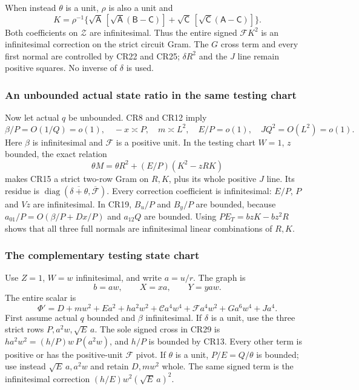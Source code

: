 When instead $\theta$ is a unit, $\rho$ is also a unit and
\[
 K=\rho^{-1}\{\sqrt{\mathsf A}\,
       [\sqrt{\mathsf A}(\mathsf B-\mathsf C)]
       +\sqrt{\mathsf C}\,
       [\sqrt{\mathsf C}(\mathsf A-\mathsf C)]\}.
 \tag{CR25}
\]
Both coefficients on $\mathcal Z$ are infinitesimal. Thus the
entire signed $\mathcal F K^2$ is an infinitesimal correction on
the strict circuit Gram. The $G$ cross term and every first normal
are controlled by CR22 and CR25; $\delta R^2$ and the $J$ line
remain positive squares. No inverse of $\delta$ is used.

\subsubsection*{An unbounded actual state ratio in the same testing chart}

Now let actual $q$ be unbounded. CR8 and CR12 imply
\[
 \beta/P=O(1/Q)=o(1),\quad -x\asymp P,\quad
 m\asymp L^2,\quad E/P=o(1),\quad JQ^2=O(L^2)=o(1).
 \tag{CR26}
\]
Here $\beta$ is infinitesimal and $\mathcal F$ is a positive
unit. In the testing chart $W=1$, $z$ bounded, the exact relation
\[
 \theta M=\theta R^2+(E/P)(K^2-zRK)
 \tag{CR27}
\]
makes CR15 a strict two-row Gram on $R,K$, plus its whole positive
$J$ line. Its residue is
$\operatorname{diag}(\overline{\delta+\theta},\overline{\mathcal F})$.
Every correction coefficient is infinitesimal: $E/P$, $P$ and
$Vz$ are infinitesimal. In CR19, $B_u/P$ and $B_y/P$ are bounded,
because $a_{01}/P=O(\beta/P+Dx/P)$ and $a_{12}Q$ are bounded.
Using $P E_T=bzK-bz^2R$ shows that all three full normals are
infinitesimal linear combinations of $R,K$.

\subsubsection*{The complementary testing state chart}

Use $Z=1$, $W=w$ infinitesimal, and write $a=u/r$. The graph is
\[
 b=aw,\qquad X=xa,\qquad Y=yaw.
 \tag{CR28}
\]
The entire scalar is
\[
 \Phi'=D+mw^2+Ea^2+ha^2w^2+\mathcal C a^4w^4
       +\mathcal F a^4w^2+Ga^6w^4+Ja^4.
 \tag{CR29}
\]
First assume actual $q$ bounded and $\beta$ infinitesimal. If
$\delta$ is a unit, use the three strict rows
$P,a^2w,\sqrt E\,a$. The sole signed cross in CR29 is
$h a^2w^2=(h/P)w\,P(a^2w)$, and $h/P$ is bounded by CR13.
Every other term is positive or has the positive-unit $\mathcal F$
pivot. If $\theta$ is a unit, $P/E=Q/\theta$ is bounded;
use instead $\sqrt E\,a,a^2w$ and retain $D,mw^2$ whole.
The same signed term is the infinitesimal correction
$(h/E)w^2(\sqrt E\,a)^2$.

